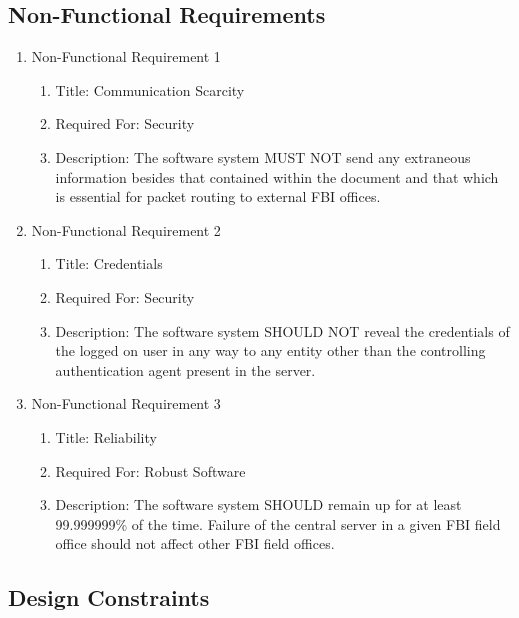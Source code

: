 \documentclass[12pt]{article}
\begin{document}
\subsection{Non-Functional Requirements}

\begin{enumerate}
    \item Non-Functional Requirement 1
    \begin{enumerate}
        \item Title: Communication Scarcity
        \item Required For: Security
        \item Description: The software system MUST NOT send any extraneous information besides that
        contained within the document and that which is essential for packet routing to external FBI offices.
    \end{enumerate}
    \item Non-Functional Requirement 2
    \begin{enumerate}
        \item Title: Credentials
        \item Required For: Security
        \item Description: The software system SHOULD NOT reveal the credentials of the logged on user
        in any way to any entity other than the controlling authentication agent present in the server.
    \end{enumerate}
    \item Non-Functional Requirement 3
    \begin{enumerate}
        \item Title: Reliability
        \item Required For: Robust Software
        \item Description: The software system SHOULD remain up for at least 99.999999\% of the time.
        Failure of the central server in a given FBI field office should not affect other FBI field offices.
    \end{enumerate}
\end{enumerate}

\subsection{Design Constraints}
\end{document}
